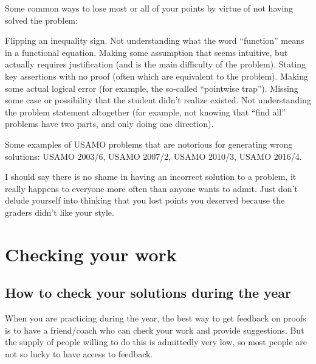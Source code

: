 \documentclass[11pt]{scrartcl}
\begin{document}
Some common ways to lose most or all of your points
by virtue of not having solved the problem:
\begin{itemize}
  \ii Flipping an inequality sign.
  \ii Not understanding what the word ``function'' means
  in a functional equation.
  \ii Making some assumption that seems intuitive,
  but actually requires justification (and is the main difficulty of the problem).
  \ii Stating key assertions with no proof
  (often which are equivalent to the problem).
  \ii Making some actual logical error
  (for example, the so-called ``pointwise trap'').
  \ii Missing some case or possibility that the student didn't realize existed.
  \ii Not understanding the problem statement altogether
  (for example, not knowing that ``find all'' problems have two parts,
  and only doing one direction).
\end{itemize}
Some examples of USAMO problems that are notorious for generating wrong solutions:
USAMO 2003/6, USAMO 2007/2, USAMO 2010/3, USAMO 2016/4.

I should say there is no shame in having an incorrect solution to a problem,
it really happens to everyone more often than anyone wants to admit.
Just don't delude yourself into thinking that you lost points
you deserved because the graders didn't like your style.

\section{Checking your work}
\subsection{How to check your solutions during the year}
When you are practicing during the year,
the best way to get feedback on proofs is to have a friend/coach
who can check your work and provide suggestions.
But the supply of people willing to do this is admittedly very low,
so most people are not so lucky to have access to feedback.
\end{document}
